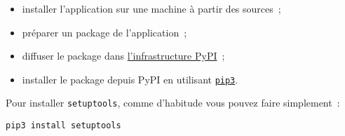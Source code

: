 \begin{itemize}
	\item 
	installer l'application sur une machine à partir des sources~;
	\item
	préparer un package de l'application~;
	\item
	diffuser le package dans
	\href{https://pypi.python.org/pypi}{l'infrastructure PyPI}~;
	\item
	installer le package depuis PyPI en utilisant
	\href{http://pip.readthedocs.org/en/latest/installing.html}{\texttt{pip3}}.
\end{itemize}

    Pour installer \texttt{setuptools}, comme d'habitude vous pouvez faire
simplement~:

\begin{verbatim}
pip3 install setuptools
\end{verbatim}